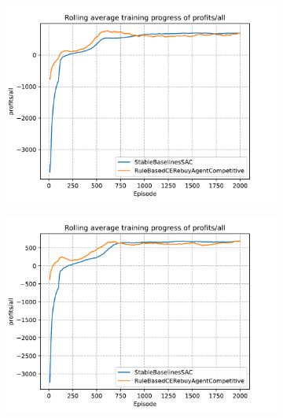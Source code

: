 \begin{figure}[t]
	\centering
	\begin{subfigure}{0.49\textwidth}
		\centering
		\includegraphics[width = \textwidth]{images/experiments/SACDuopoly/SACDuopolyProfitsMean1.pdf}\\
		\label{fig:SACDuopolyProfitsMean1}
	\end{subfigure}
	\begin{subfigure}{0.49\textwidth}
		\centering
		\includegraphics[width = \textwidth]{images/experiments/SACDuopoly/SACDuopolyProfitsMean2.pdf}\\
		\label{fig:SACDuopolyProfitsMean2}
	\end{subfigure}

\end{figure}
